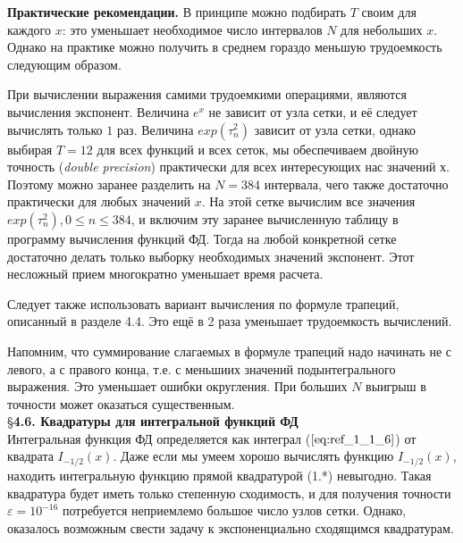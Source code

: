 \textbf{Практические рекомендации.} В принципе можно подбирать $T$ своим для каждого $x$: это уменьшает необходимое число интервалов $N$ для небольших $x$. Однако на практике можно получить в среднем гораздо меньшую трудоемкость следующим образом.

При вычислении выражения самими трудоемкими операциями, являются вычисления экспонент. Величина $e^x$ не зависит от узла сетки, и её следует вычислять только $1$ раз. Величина $exp(\tau_n^2)$ зависит от узла сетки, однако выбирая $T = 12$ для всех функций и всех сеток, мы обеспечиваем двойную точность (\textit{double precision}) практически для всех интересующих нас значений $х$. Поэтому можно заранее разделить на $N = 384$ интервала, чего также достаточно практически для любых значений $x$. На этой сетке вычислим все значения $exp(\tau_n^2), 0 \leqslant n \leqslant 384$, и включим эту заранее вычисленную таблицу в программу вычисления функций ФД. Тогда на любой конкретной сетке достаточно делать только выборку необходимых значений экспонент. Этот несложный прием многократно уменьшает время расчета.

Следует также использовать вариант вычисления по формуле трапеций, описанный в разделе 4.4. Это ещё в 2 раза уменьшает трудоемкость вычислений.

Напомним, что суммирование слагаемых в формуле трапеций надо начинать не с левого, а с правого конца, т.е. с меньшиих значений подынтегрального выражения. Это уменьшает ошибки округления. При больших $N$ выигрыш в точности может оказаться существенным.
\\

\S \textbf{4.6. Квадратуры для интегральной функций ФД}
\\

Интегральная функция ФД определяется как интеграл ($\ref{eq:ref_1_1_6}$) от квадрата $I_{-1/2}(x)$. Даже если мы умеем хорошо вычислять функцию $I_{-1/2}(x)$, находить интегральную функцию прямой квадратурой (1.*) невыгодно. Такая квадратура будет иметь только степенную сходимость, и для получения точности $\varepsilon = 10^{-16}$ потребуется неприемлемо большое число узлов сетки. Однако, оказалось возможным свести задачу к экспоненциально сходящимся квадратурам.

